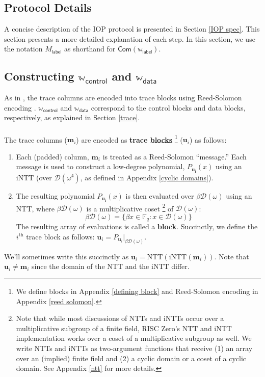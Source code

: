 \documentclass[10pt,letterpaper,titlepage]{article}
\newcommand{\GF}[1]{\mathbb{F}_{#1}}
\newcommand{\w}[0]{\omega}
\newcommand{\D}[0]{\mathcal{D}}
\theoremstyle{definition}
\begin{document}
\begin{appendices}
\section{Protocol Details}
A concise description of the IOP protocol is presented in Section \ref{IOP spec}. 
This section presents a more detailed explanation of each step. 
In this section, we use the notation $M_\mathsf{label}$ as shorthand for $\mathsf{Com}(\mathbb{w}_\mathsf{label})$.
\subsection{Constructing $\mathbb{w}_\mathsf{control}$ and $\mathbb{w}_\mathsf{data}$}
\label{committing trace}
As in \cite{stark}, the trace columns are encoded into trace blocks using Reed-Solomon encoding \cite{reed-solomon}. 
$\mathbb{w}_\mathsf{control}$ and $\mathbb{w}_\mathsf{data}$ correspond to the control blocks and data blocks, respectively, as explained in Section \ref{trace}.\\
\\
The trace columns ($\mathbf{m}_i$) are encoded as \textbf{trace \hyperref[blocks]{blocks}}%
\footnote{We define blocks in Appendix \ref{defining block} and Reed-Solomon encoding in Appendix \ref{reed solomon}.} ($\mathbf{u}_i$) as follows: 
\begin{enumerate}
\item Each (padded) column, $\mathbf{m}_i$ is treated as a Reed-Solomon\cite{reed-solomon} ``message.'' 
Each message is used to construct a low-degree polynomial, $P_{\mathbf{u_i}}(x)$ using an iNTT (over $\D(\w^4)$, as defined in Appendix \ref{cyclic domains}).
\item The resulting polynomial $P_{\mathbf{u_i}}(x)$ is then evaluated over $\beta\D(\w)$ using an NTT, where $\beta\D(\w)$ is a multiplicative coset%
\footnote{Note that while most discussions of NTTs and iNTTs occur over a multiplicative subgroup of a finite field, RISC Zero's NTT and iNTT implementation works over a coset of a multiplicative subgroup as well. 
We write NTTs and iNTTs as two-argument functions that receive (1) an array over an (implied) finite field and (2) a cyclic domain or a coset of a cyclic domain. 
See Appendix \ref{ntt} for more details.} of $\D(\w)$:
\begin{equation*}
\beta\D(\w) = \{\beta x\in\GF{q} : x \in \D(\w)\}
\end{equation*}
The resulting array of evaluations is called a \textbf{block}. Succinctly, we define the $i^\text{th}$ trace block as follows: $\mathbf{u}_i = P_{\mathbf{u}_i}\big|_{\beta\D(\w)}$. 
\end{enumerate} 
We'll sometimes write this succinctly as $\mathbf{u}_i = \text{NTT}(\text{iNTT}(\mathbf{m}_i))$. 
Note that $\mathbf{u}_i \neq \mathbf{m}_i$ since the domain of the NTT and the iNTT differ. 

\end{appendices}
\end{document}
